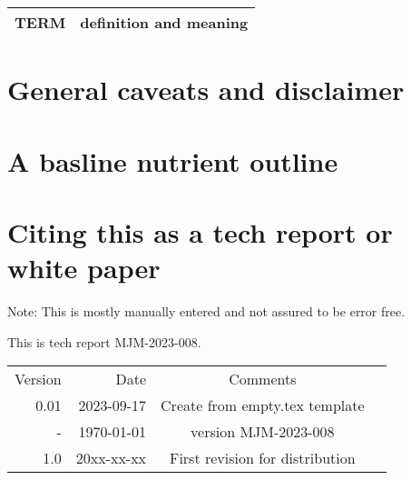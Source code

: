 \documentclass[aps,secnumarabic,balancelastpage,amsmath,amssymb,nofootinbib]{revtex4}
\newcommand{\mjmversion}{\mjmrelease} %
\newcommand{\mjmtrno}{MJM-2023-008}
\newcommand{\mjmversion}{0.00} %
\newcommand{\mjmtrno}{MJM-2023-008}
\newcommand{\mjmmakedate}{2023-09-17 }
\begin{document}
\begin{comment}
\end{comment}


\noindent
\begin{tabular}{@{}ll}
TERM & definition and meaning   \\
\hline
\end{tabular} %


\section{General caveats and disclaimer }
\label{appendix:caveats}

%



\section{ A basline nutrient outline  }
\label{appendix:baseline}


\section{Citing this as a tech report or white paper }
\label{appendix:citing}

Note: This is mostly manually entered and not assured to be error free.

This is tech report \mjmtrno. 

\begin{table}[H] \centering
\begin{tabular}{r|r|c|r}
Version & Date & Comments  &  \\
0.01 & \mjmmakedate  &  Create from empty.tex template  &  \\
-  & \today & version  \mjmversion { }   \mjmtrno  &  \\
1.0 & 20xx-xx-xx & First revision for distribution &  \\
\end{tabular}
\end{table}
\end{document}
